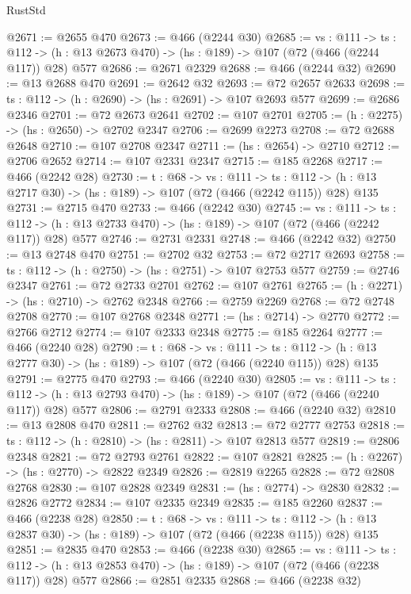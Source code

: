 \begin{lexlean}{RustStd}
\begin{coremodule}
{\begin{coremodule}
{{{{@2671 := @2655 @470
@2673 := @466 (@2244 @30)
@2685 := {vs : @111} ->
  {ts : @112} -> (h : @13 @2673 @470) -> (hs : @189) -> @107 (@72 (@466 (@2244 @117)) @28) @577
@2686 := @2671 @2329
@2688 := @466 (@2244 @32)
@2690 := @13 @2688 @470
@2691 := @2642 @32
@2693 := @72 @2657 @2633
@2698 := {ts : @112} -> (h : @2690) -> (hs : @2691) -> @107 @2693 @577
@2699 := @2686 @2346
@2701 := @72 @2673 @2641
@2702 := @107 @2701
@2705 := (h : @2275) -> (hs : @2650) -> @2702 @2347
@2706 := @2699 @2273
@2708 := @72 @2688 @2648
@2710 := @107 @2708 @2347
@2711 := (hs : @2654) -> @2710
@2712 := @2706 @2652
@2714 := @107 @2331 @2347
@2715 := @185 @2268
@2717 := @466 (@2242 @28)
@2730 := {t : @68} ->
  {vs : @111} ->
  {ts : @112} -> (h : @13 @2717 @30) -> (hs : @189) -> @107 (@72 (@466 (@2242 @115)) @28) @135
@2731 := @2715 @470
@2733 := @466 (@2242 @30)
@2745 := {vs : @111} ->
  {ts : @112} -> (h : @13 @2733 @470) -> (hs : @189) -> @107 (@72 (@466 (@2242 @117)) @28) @577
@2746 := @2731 @2331
@2748 := @466 (@2242 @32)
@2750 := @13 @2748 @470
@2751 := @2702 @32
@2753 := @72 @2717 @2693
@2758 := {ts : @112} -> (h : @2750) -> (hs : @2751) -> @107 @2753 @577
@2759 := @2746 @2347
@2761 := @72 @2733 @2701
@2762 := @107 @2761
@2765 := (h : @2271) -> (hs : @2710) -> @2762 @2348
@2766 := @2759 @2269
@2768 := @72 @2748 @2708
@2770 := @107 @2768 @2348
@2771 := (hs : @2714) -> @2770
@2772 := @2766 @2712
@2774 := @107 @2333 @2348
@2775 := @185 @2264
@2777 := @466 (@2240 @28)
@2790 := {t : @68} ->
  {vs : @111} ->
  {ts : @112} -> (h : @13 @2777 @30) -> (hs : @189) -> @107 (@72 (@466 (@2240 @115)) @28) @135
@2791 := @2775 @470
@2793 := @466 (@2240 @30)
@2805 := {vs : @111} ->
  {ts : @112} -> (h : @13 @2793 @470) -> (hs : @189) -> @107 (@72 (@466 (@2240 @117)) @28) @577
@2806 := @2791 @2333
@2808 := @466 (@2240 @32)
@2810 := @13 @2808 @470
@2811 := @2762 @32
@2813 := @72 @2777 @2753
@2818 := {ts : @112} -> (h : @2810) -> (hs : @2811) -> @107 @2813 @577
@2819 := @2806 @2348
@2821 := @72 @2793 @2761
@2822 := @107 @2821
@2825 := (h : @2267) -> (hs : @2770) -> @2822 @2349
@2826 := @2819 @2265
@2828 := @72 @2808 @2768
@2830 := @107 @2828 @2349
@2831 := (hs : @2774) -> @2830
@2832 := @2826 @2772
@2834 := @107 @2335 @2349
@2835 := @185 @2260
@2837 := @466 (@2238 @28)
@2850 := {t : @68} ->
  {vs : @111} ->
  {ts : @112} -> (h : @13 @2837 @30) -> (hs : @189) -> @107 (@72 (@466 (@2238 @115)) @28) @135
@2851 := @2835 @470
@2853 := @466 (@2238 @30)
@2865 := {vs : @111} ->
  {ts : @112} -> (h : @13 @2853 @470) -> (hs : @189) -> @107 (@72 (@466 (@2238 @117)) @28) @577
@2866 := @2851 @2335
@2868 := @466 (@2238 @32)
}}}}
\end{coremodule}}
\end{coremodule}
\end{lexlean}
